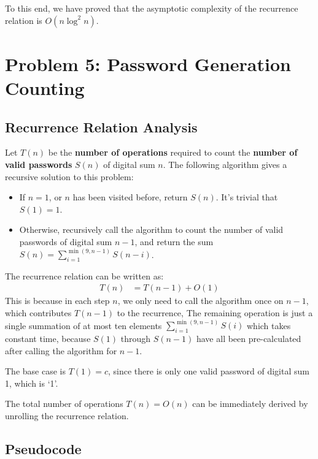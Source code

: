 \documentclass[11pt, a4paper, oneside]{memoir}
\begin{document}
To this end, we have proved that the asymptotic complexity of the recurrence relation is $O(n \log^2 n)$.

\chapter{Problem 5: Password Generation Counting}
\section{Recurrence Relation Analysis}
Let $T(n)$ be the \textbf{number of operations} required to count the \textbf{number of valid passwords} $S(n)$ of digital sum $n$.
The following algorithm gives a recursive solution to this problem:
\begin{itemize}
    \item If $n = 1$, or $n$ has been visited before, return $S(n)$. It's trivial that $S(1) = 1$.
    \item Otherwise, recursively call the algorithm to count the number of valid passwords of digital sum $n-1$, and return the sum $S(n) = \sum_{i=1}^{\min(9, n-1)} S(n-i)$.
\end{itemize}
The recurrence relation can be written as:
\begin{align*}
    T(n) &= T(n-1) + O(1)
\end{align*}
This is because in each step $n$, we only need to call the algorithm once on $n-1$, which contributes $T(n-1)$ to the recurrence,
The remaining operation is just a single summation of at most ten elements $\sum_{i=1}^{\min(9, n-1)} S(i)$ which takes constant time, because $S(1)$ through $S(n-1)$ have all been pre-calculated after calling the algorithm for $n-1$.

The base case is $T(1) = c$, since there is only one valid password of digital sum 1, which is `1'.

The total number of operations $T(n)=O(n)$ can be immediately derived by unrolling the recurrence relation.
\section{Pseudocode}
\end{document}
